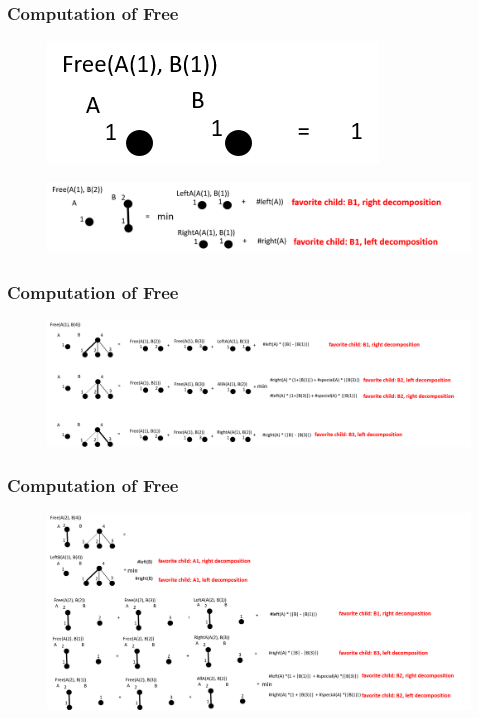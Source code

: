 \documentclass{beamer}
\begin{document}
\begin{frame}
\frametitle{Computation of Free}
\begin{figure}
	\includegraphics[width=0.4\linewidth]{Free_1_1}
	\label{Free_1_1} 
	\centering
\end{figure}
\begin{figure}
	\includegraphics[width=1.1\linewidth]{Free_1_2}
	\label{Free_1_2} 
	\centering
\end{figure}

\end{frame}


\begin{frame}
\frametitle{Computation of Free}
\begin{figure}
	\includegraphics[width=1.0\linewidth]{Free_1_4}
	\label{Free_1_4} 
	\centering
\end{figure}

\end{frame}

\begin{frame}
\frametitle{Computation of Free}
\begin{figure}
	\includegraphics[width=1.0\linewidth]{Free_2_4}
	\label{Free_2_4} 
	\centering
\end{figure}

\end{frame}
\end{document}
